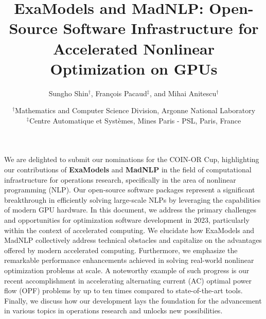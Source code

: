 
\usepackage{wrapfig}
\title{ExaModels and MadNLP: Open-Source Software Infrastructure for Accelerated Nonlinear Optimization on GPUs}
\author{Sungho Shin$^\dag$, François Pacaud$^\ddag$, and Mihai Anitescu$^\dag$} 
\date{\small
  $^\dag$Mathematics and Computer Science Division, Argonne National Laboratory\\
  $^\ddag$Centre Automatique et Systèmes, Mines Paris - PSL, Paris, France
}

\maketitle

We are delighted to submit our nominations for the COIN-OR Cup,
highlighting our contributions of {\bf ExaModels} \cite{examodels} and
{\bf MadNLP} \cite{madnlp} in the field of computational
infrastructure for operations research, specifically in the area of
nonlinear programming (NLP). Our open-source software packages
represent a significant breakthrough in efficiently solving
large-scale NLPs by leveraging the capabilities of modern GPU
hardware.  In this document, we address the primary challenges and
opportunities for optimization software development in 2023,
particularly within the context of accelerated computing. We elucidate
how ExaModels and MadNLP collectively address technical obstacles and
capitalize on the advantages offered by modern accelerated
computing. Furthermore, we emphasize the remarkable performance
enhancements achieved in solving real-world nonlinear optimization
problems at scale. A noteworthy example of such progress is our recent
accomplishment in accelerating alternating current (AC) optimal power
flow (OPF) problems by up to ten times compared to state-of-the-art
tools. Finally, we discuss how our development lays the foundation for
the advancement in various topics in operations research and unlocks
new possibilities.

